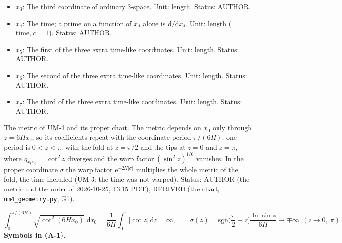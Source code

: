 \documentclass[
  10pt,
]{article}
\begin{document}
\begin{itemize}
  Status: AUTHOR.
\item
  \(x_3\): The third coordinate of ordinary 3-space. Unit: length.
  Status: AUTHOR.
\item
  \(x_4\): The time; a prime on a function of \(x_4\) alone is
  \(\mathrm{d}/\mathrm{d}x_4\). Unit: length (= time, \(c = 1\)).
  Status: AUTHOR.
\item
  \(x_5\): The first of the three extra time-like coordinates. Unit:
  length. Status: AUTHOR.
\item
  \(x_6\): The second of the three extra time-like coordinates. Unit:
  length. Status: AUTHOR.
\item
  \(x_7\): The third of the three extra time-like coordinates. Unit:
  length. Status: AUTHOR.
\end{itemize}

The metric of UM-4 and its proper chart. The metric depends on \(x_0\)
only through \(z = 6Hx_0\), so its coefficients repeat with the
coordinate period \(\pi/(6H)\): one period is \(0 < z < \pi\), with the
fold at \(z = \pi/2\) and the tips at \(z = 0\) and \(z = \pi\), where
\(g_{x_0x_0} = \cot^2z\) diverges and the warp factor
\((\sin^2z)^{1/6}\) vanishes. In the proper coordinate \(\sigma\) the
warp factor \(\mathrm{e}^{-2H\lvert\sigma\rvert}\) multiplies the whole
metric of the fold, the time included (UM-3: the time was not warped).
Status: AUTHOR (the metric and the order of 2026-10-25, 13:15 PDT),
DERIVED (the chart, \texttt{um4\_geometry.py}, G1).

\[
\int_0^{\pi/(6H)}\sqrt{\cot^2(6Hx_0)}\;\mathrm{d}x_0 = \frac{1}{6H}\int_0^{\pi}\lvert\cot z\rvert\,\mathrm{d}z = \infty,\qquad
\sigma(z) = \mathrm{sgn}\Big(\frac{\pi}{2} - z\Big)\frac{\ln\sin z}{6H} \to \mp\infty\ \ (z \to 0,\ \pi) \tag{A-1}
\] \textbf{Symbols in (A-1).}
\end{document}
